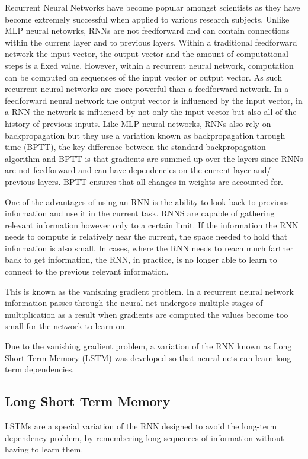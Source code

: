 \documentclass[twocolumn]{webofc}
\begin{document}
Recurrent Neural Networks have become popular amongst scientists as they have become extremely successful when applied to various research subjects.
Unlike MLP neural netowrks, RNNs are not feedforward and can contain connections within the current layer and to previous layers. Within a traditional feedforward network the input vector, the output vector and the amount of computational steps is a fixed value. However, within a recurrent neural network, computation can be computed on sequences of the input vector or output vector. As such recurrent neural networks are more powerful than a feedforward network. In a feedforward neural network the output vector is influenced by the input vector, in a RNN the network is influenced by not only the input vector but also all of the history of previous inputs. Like MLP neural networks, RNNs also rely on backpropagation but they use a variation known as backpropagation through time (BPTT), the key difference between the standard backpropagation algorithm and BPTT is that gradients are summed up over the layers since RNNs are not feedforward and can have dependencies on the current layer and/ previous layers. BPTT ensures that all changes in weights are accounted for.

One of the advantages of using an RNN is the ability to look back to previous information and use it in the current task. RNNS are capable of gathering relevant information however only to a certain limit. If the information the RNN needs to compute is relatively near the current, the space needed to hold that information is also small. In cases, where the RNN needs to reach much farther back to get information, the RNN, in practice, is no longer able to learn to connect to the previous relevant information.

This is known as the vanishing gradient problem. In a recurrent neural network information passes through the neural net undergoes multiple stages of multiplication as a result when gradients are computed the values become too small for the network to learn on.

Due to the vanishing gradient problem, a variation of the RNN known as Long Short Term Memory (LSTM) was developed so that neural nets can learn long term dependencies. 

\subsection{Long Short Term Memory}\label{sec:models}

LSTMs are a special variation of the RNN designed to avoid the long-term dependency problem, by remembering long sequences of information without having to learn them.
\end{document}
